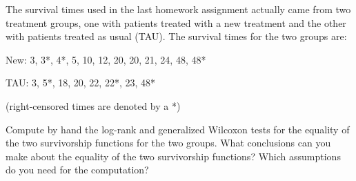 \documentclass[12pt]{elegantbook}
\begin{document}
    \begin{exercise*}[2]
        The survival times used in the last homework assignment actually came from two treatment groups, one with patients treated with a new treatment and the other with patients treated as usual (TAU). The survival times for the two groups are:

        New: 3, 3*, 4*, 5, 10, 12, 20, 20, 21, 24, 48, 48*
        
        TAU: 3, 5*, 18, 20, 22, 22*, 23, 48*

        (right-censored times are denoted by a *)

        \noindent Compute by hand the log-rank and generalized Wilcoxon tests for the equality of the two survivorship functions for the two groups. What conclusions can you make about the equality of the two survivorship functions? Which assumptions do you need for the computation? 
    \end{exercise*}
\end{document}
